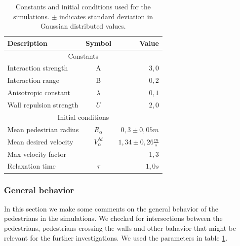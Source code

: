 \begin{table}[ht]
    \begin{center}
        \begin{tabular}{l c r}
            \toprule
            \textbf{Description} & \textbf{Symbol} & \textbf{Value} \\
            \midrule
            \multicolumn{3}{c}{\textsf{Constants}}\\
            Interaction strength & A & $3,0$ \\
            Interaction range & B & $0,2$ \\
            Anisotropic constant & $\lambda$ & $0,1$ \\
            Wall repulsion strength & $U$ &  $2,0$ \\
            \midrule
            \multicolumn{3}{c}{\textsf{Initial conditions}}\\
            Mean pedestrian radius & $R_\alpha$ & $0,3 \pm 0,05 m$\\
            Mean desired velocity &  $V^{Id}_\alpha$ &  $1,34 \pm 0,26
            \frac{m}{s}$ \\
            Max velocity factor &  &  $1,3$ \\
            Relaxation time & $\tau$ & $1,0 s$\\
            \bottomrule
        \end{tabular}
        \caption[Constants and initial conditions]{Constants and initial
        conditions used for the simulations. $\pm$ indicates standard
        deviation in Gaussian distributed values.}
        \label{tbl:parameter-settings}
    \end{center}
\end{table}

\subsubsection{General behavior}
In this section we make some comments on the general behavior of
the pedestrians in the simulations. We checked for intersections between
the pedestrians, pedestrians crossing the walls and other bahavior that might
be relevant for the further investigations. We used the parameters in table
\ref{tbl:parameter-settings}.\\

